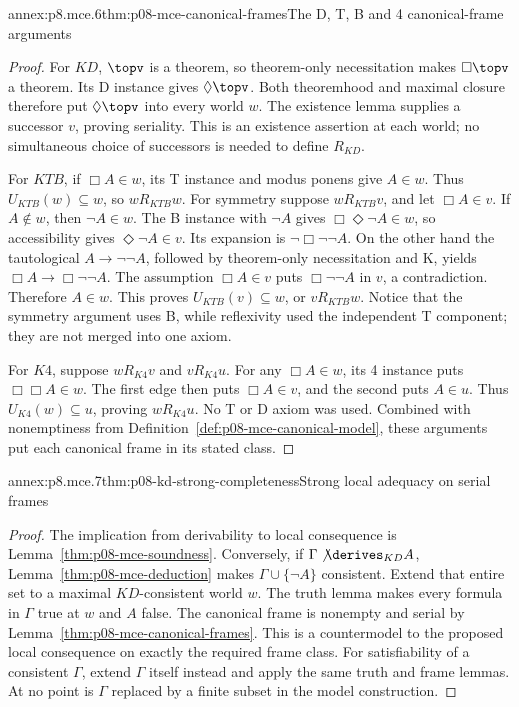 \begin{annexitem}{annex:p8.mce.6}{thm:p08-mce-canonical-frames}{The D, T, B and 4 canonical-frame arguments}
\begin{proof}
For \(KD\), \(\topv\) is a theorem, so theorem-only
necessitation makes \(\Box\topv\) a theorem. Its D instance gives
\(\Diamond\topv\). Both theoremhood and maximal closure therefore
put \(\Diamond\topv\) into every world \(w\). The existence
lemma supplies a successor \(v\), proving seriality. This is an
existence assertion at each world; no simultaneous choice of successors
is needed to define \(R_{KD}\).

For \(KTB\), if \(\Box A\in w\), its T instance and modus
ponens give \(A\in w\). Thus \(U_{KTB}(w)\subseteq w\),
so \(wR_{KTB}w\). For symmetry suppose \(wR_{KTB}v\), and let
\(\Box A\in v\). If \(A\notin w\), then \(\neg A\in w\).
The B instance with \(\neg A\) gives \(\Box\Diamond\neg A\in w\),
so accessibility gives \(\Diamond\neg A\in v\). Its expansion is
\(\neg\Box\neg\neg A\). On the other hand the tautological
\(A\to\neg\neg A\), followed by theorem-only necessitation and
K, yields \(\Box A\to\Box\neg\neg A\). The assumption
\(\Box A\in v\) puts \(\Box\neg\neg A\) in \(v\), a
contradiction. Therefore \(A\in w\). This proves
\(U_{KTB}(v)\subseteq w\), or \(vR_{KTB}w\). Notice that the
symmetry argument uses B, while reflexivity used the independent T
component; they are not merged into one axiom.

For \(K4\), suppose \(wR_{K4}v\) and \(vR_{K4}u\). For any
\(\Box A\in w\), its 4 instance puts \(\Box\Box A\in w\).
The first edge then puts \(\Box A\in v\), and the second puts
\(A\in u\). Thus \(U_{K4}(w)\subseteq u\), proving
\(wR_{K4}u\). No T or D axiom was used. Combined with nonemptiness
from Definition~\ref{def:p08-mce-canonical-model}, these arguments put
each canonical frame in its stated class.
\end{proof}
\end{annexitem}

\begin{annexitem}{annex:p8.mce.7}{thm:p08-kd-strong-completeness}{Strong local adequacy on serial frames}
\begin{proof}
The implication from derivability to local consequence is
Lemma~\ref{thm:p08-mce-soundness}. Conversely, if
\(\Gamma\not\derives_{KD}A\),
Lemma~\ref{thm:p08-mce-deduction} makes
\(\Gamma\cup\{\neg A\}\) consistent. Extend that entire set to
a maximal \(KD\)-consistent world \(w\). The truth lemma makes
every formula in \(\Gamma\) true at \(w\) and \(A\) false.
The canonical frame is nonempty and serial by
Lemma~\ref{thm:p08-mce-canonical-frames}. This is a countermodel to
the proposed local consequence on exactly the required frame class.
For satisfiability of a consistent \(\Gamma\), extend \(\Gamma\)
itself instead and apply the same truth and frame lemmas. At no point is
\(\Gamma\) replaced by a finite subset in the model construction.
\end{proof}
\end{annexitem}

